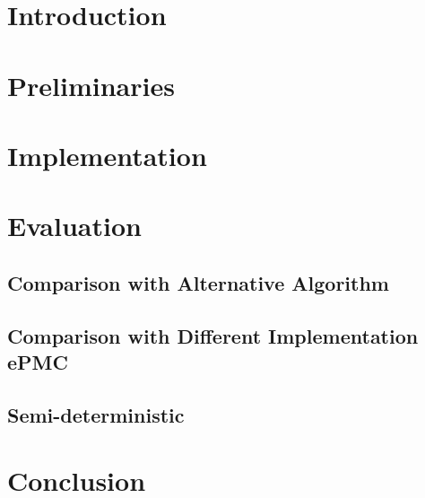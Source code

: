\documentclass{fithesis3}
\begin{document}
	\chapter{Introduction}
	\chapter{Preliminaries}
	\chapter{Implementation}
	\chapter{Evaluation}
	\section{Comparison with Alternative Algorithm}
	\section{Comparison with Different Implementation ePMC}
	\section{Semi-deterministic}
	\chapter{Conclusion}
\end{document}
